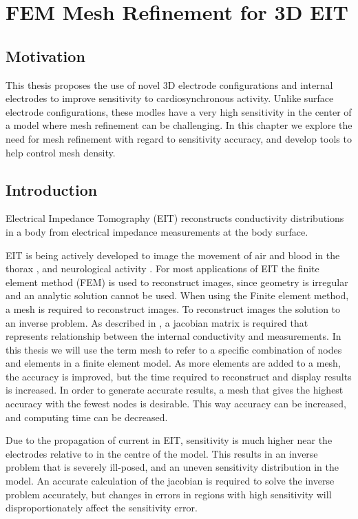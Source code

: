 \chapter{FEM Mesh Refinement for 3D EIT}
\label{chap:chapter-4}

\section{Motivation}
This thesis proposes the use of novel 3D electrode configurations 
and internal electrodes to improve sensitivity to 
cardiosynchronous activity. Unlike surface electrode configurations, these 
modles have a very high 
sensitivity in the center of a model where mesh refinement can be challenging. 
In this chapter we explore the need for mesh refinement with regard
to sensitivity accuracy, and develop tools to help control mesh density. 

\section{Introduction}
Electrical Impedance Tomography (EIT) reconstructs
conductivity distributions in a body from electrical impedance measurements 
at the body surface. 

EIT is being actively developed to image the movement of air and 
blood in the thorax \parencite{nguyen_review_2012}, and 
neurological activity \parencite{holder_electrical_1992}. 
For most applications of EIT the finite element method (FEM) is 
used to reconstruct images, since geometry is irregular and 
an analytic solution cannot be used. When using the Finite element method,
a mesh is required to reconstruct images. 
To reconstruct images the solution to an inverse problem. 
As described in , a jacobian matrix
is required that represents relationship between the internal conductivity
and measurements.
In this thesis we will use the term mesh to refer to a specific 
combination of nodes and elements in a finite element model. 
As more elements are added to a mesh, the accuracy is improved,
but the time required to reconstruct and display results is increased. 
In order to generate accurate results, a mesh that gives the highest accuracy 
with the fewest nodes is desirable. This way accuracy can be increased, and
computing time can be decreased.

Due to the propagation of current in EIT, sensitivity is much higher near the
electrodes relative to in the centre of the model. This results in an inverse problem
that is severely ill-posed,
and an uneven sensitivity distribution in the model. 
An accurate calculation of the jacobian is required to solve the inverse
problem accurately, but changes in errors in regions with high sensitivity 
will disproportionately affect the sensitivity error. 

